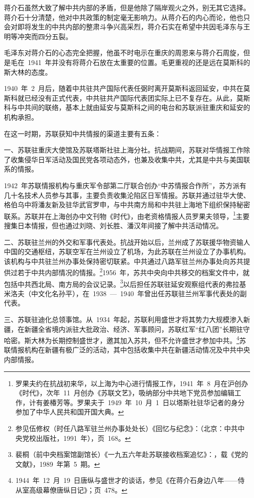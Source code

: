 蒋介石虽然大致了解中共内部的矛盾，但是他除了隔岸观火之外，别无其它选择。蒋介石十分清楚，他对中共政策的制定毫无影响力。从蒋介石的内心而论，他也只会对即将发生的中共内部的整肃斗争兴高采烈，蒋介石实在希望中共因毛泽东与王明等冲突而四分五裂。

毛泽东对蒋介石的心态完全把握，他虽不时电示在重庆的周恩来与蒋介石周旋，但是毛在~1941~年并没有将蒋介石放在太重要的位置。毛更重视的还是远在莫斯科的斯大林的态度。

1940~年~2~月后，随着中共驻共产国际代表任弼时离开莫斯科返回延安，中共在莫斯科就已经没有正式代表，中共驻共产国际代表团实际上已不复存在。从此，莫斯科与中共间的联络，基本上就由延安与莫斯科之间的电台和苏联派驻重庆和延安的机构承担。

在这一时期，苏联获知中共情报的渠道主要有五条：

一、苏联驻重庆大使馆及苏联塔斯社驻上海分社。抗战期间，苏联对华情报工作除了收集侵华日军活动及国民党各项动态外，也兼及收集中共，尤其是中共与美国联系的情报。

1942~年苏联情报机构与重庆军令部第二厅联合创办“中苏情报合作所”，苏方派有几十名技术人员参与其事，主要负责收集沦陷区日军情报。苏联并通过驻华大使、格伯乌中将潘友新及驻华武官罗申，与中共南方局和中共驻上海地下组织保持秘密联系。苏联并在上海创办中文刊物《时代》，由老资格情报人员罗果夫领导，\footnote{罗果夫约在抗战初来华，以上海为中心进行情报工作，1941~年~8~月在沪创办《时代》，次年~11~月创办《苏联文艺》，吸纳部分中共地下党员参加编辑工作，计有姜椿芳等。罗果夫于~1949~年~10~月~1~日以塔斯社驻华记者的身分参加了中华人民共和国开国大典。}主要搜集日本情报，但也通过刘晓、刘长胜、潘汉年间接了解中共活动情况。

二、苏联驻兰州的外交和军事代表处。抗战开始以后，兰州成了苏联援华物资输人中国的交通枢纽，苏联空军在兰州设立了机场，为此苏联在兰州设立了办事机构。该机构与中共驻兰州办事处保持密切联紧。中共通过八路军驻兰州办事处向苏共提供过若于中共内部情况的情报。\footnote{参见伍修权（时任八路军驻兰州办事处处长）《回忆与纪念》：（北京：中共中央党校出版社，1991~年），页~168。}1956~年，苏共中央向中共移交的档案文件中，就包括中共西北局、南方局的会议记录。\footnote{裴桐（前中央档案馆副馆长）《一九五六年赴苏联接收档案追忆》：，载《党的文献》，1989~年第~5~期。}以后担任苏联驻延安观察组代表的弗拉基米洛夫（中文化名孙平），在~1938~—~1940~年曾出任苏联驻兰州军事代表处的副代表。

三、苏联驻迪化总领事馆。从~1934~年起，苏联利用盛世才将其势力大规模渗入新疆，在新疆全省境内派驻大批政治、经济、军事顾问，苏联红军“红八团”长期驻守哈密。斯大林为长期控制盛世才，邀其加入苏共，但不允许盛世才参加中共。\footnote{1944~年~12~月~19~日唐纵与盛世才的谈话，参见《在蒋介石身边八年——侍从室高级幕僚唐纵日记》；页~478。}苏联情报机构在新疆有极广泛的活动，其中包括收集中共在新疆活动情况及中共中央内部情报。

